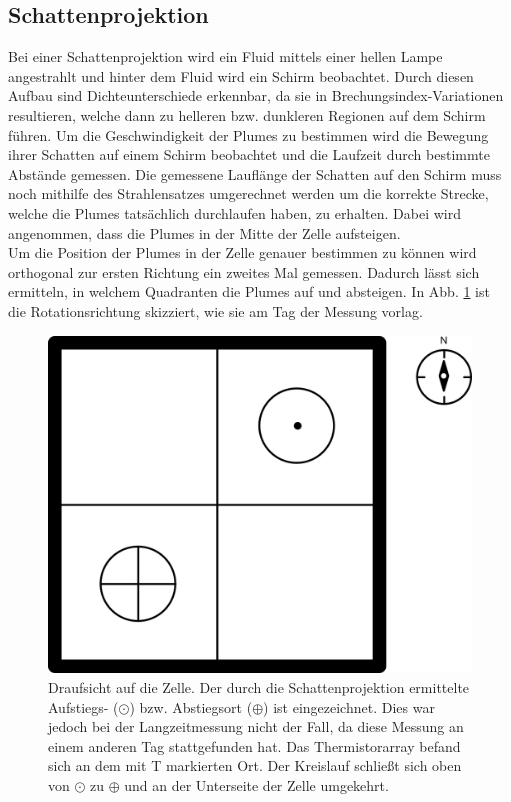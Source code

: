 \documentclass[12pt,a4paper,titlepage,headinclude]{scrartcl}
\numberwithin{equation}{subsection}
\begin{document}
\subsection{Schattenprojektion}
\label{sec:schattenproj}
Bei einer Schattenprojektion wird ein Fluid mittels einer hellen Lampe angestrahlt und hinter dem Fluid wird ein Schirm beobachtet.
Durch diesen Aufbau sind Dichteunterschiede erkennbar, da sie in Brechungsindex-Variationen resultieren, welche dann zu helleren bzw. dunkleren Regionen auf dem Schirm führen.
Um die Geschwindigkeit der Plumes zu bestimmen wird die Bewegung ihrer Schatten auf einem Schirm beobachtet und die Laufzeit durch bestimmte Abstände gemessen.
Die gemessene Lauflänge der Schatten auf den Schirm muss noch mithilfe des Strahlensatzes umgerechnet werden um die korrekte Strecke, welche die Plumes tatsächlich durchlaufen haben, zu erhalten.
Dabei wird angenommen, dass die Plumes in der Mitte der Zelle aufsteigen.\\

Um die Position der Plumes in der Zelle genauer bestimmen zu können wird orthogonal zur ersten Richtung ein zweites Mal gemessen.
Dadurch lässt sich ermitteln, in welchem Quadranten die Plumes auf und absteigen.
In Abb. \ref{fig:konvektion} ist die Rotationsrichtung skizziert, wie sie am Tag der Messung vorlag.
\begin{figure}[h]
	\centering
	\includegraphics[width=0.6\linewidth]{konvektion_skizze}
	\caption{Draufsicht auf die Zelle. Der durch die Schattenprojektion ermittelte Aufstiegs- ($\odot$) bzw. Abstiegsort ($\oplus$) ist eingezeichnet. Dies war jedoch bei der Langzeitmessung nicht der Fall, da diese Messung an einem anderen Tag stattgefunden hat. Das Thermistorarray befand sich an dem mit \textsf T markierten Ort. Der Kreislauf schließt sich oben von $\odot$ zu $\oplus$ und an der Unterseite der Zelle umgekehrt.}
	\label{fig:konvektion}
\end{figure}
\end{document}
